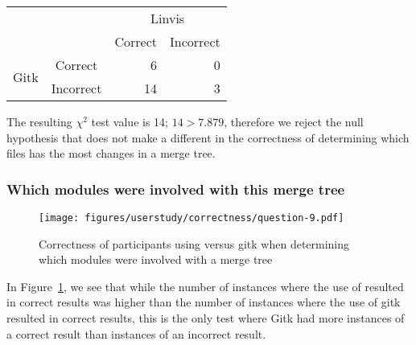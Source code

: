 
\begin{center}
  \begin{tabular}{cc|rr}
                           &           & \multicolumn{2}{c}{Linvis}\\
                           &           & Correct                      & Incorrect\\\hline
    \multirow{2}{*}{Gitk}  & Correct   & 6                            & 0\\
                           & Incorrect & 14                           & 3\\
  \end{tabular}
\end{center}

The resulting $\chi^2$ test value is 14; $14 > 7.879$, therefore we
reject the null hypothesis that \tool does not make a different in the
correctness of determining which files has the most changes in a merge
tree.

\subsubsection{Which modules were involved with this merge tree}
\label{ssub:which_modules_were_involved_with_this_merge_tree}

\begin{figure}[htpb]
  \centering
  \texttt{[image: figures/userstudy/correctness/question-9.pdf]}
  \caption{Correctness of participants using \tool versus gitk when
    determining which modules were involved with a merge tree}
  \label{fig:q_9_correctness}
\end{figure}

In Figure~\ref{fig:q_9_correctness}, we see that while the number of
instances where the use of \tool resulted in correct results was higher
than the number of instances where the use of gitk resulted in correct
results, this is the only test where Gitk had more instances of a
correct result than instances of an incorrect result.




